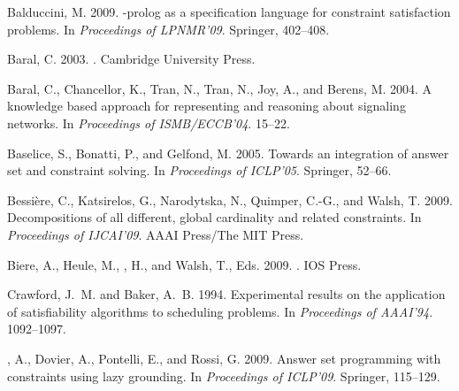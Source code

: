 \documentclass{tlp}
\begin{document}
\begin{thebibliography}{}

{\sc Balduccini, M.} 2009.
-prolog as a specification language for constraint satisfaction
  problems.
\newblock In {\em Proceedings of LPNMR'09}. Springer, 402--408.

{\sc Baral, C.} 2003.
.
\newblock Cambridge University Press.

{\sc Baral, C.}, {\sc Chancellor, K.}, {\sc Tran, N.}, {\sc Tran, N.}, {\sc
  Joy, A.}, {\sc and} {\sc Berens, M.} 2004.
\newblock A knowledge based approach for representing and reasoning about
  signaling networks.
\newblock In {\em Proceedings of ISMB/ECCB'04}. 15--22.

{\sc Baselice, S.}, {\sc Bonatti, P.}, {\sc and} {\sc Gelfond, M.} 2005.
\newblock Towards an integration of answer set and constraint solving.
\newblock In {\em Proceedings of ICLP'05}. Springer, 52--66.

{\sc Bessi{\`e}re, C.}, {\sc Katsirelos, G.}, {\sc Narodytska, N.}, {\sc
  Quimper, C.-G.}, {\sc and} {\sc Walsh, T.} 2009.
\newblock Decompositions of all different, global cardinality and related
  constraints.
\newblock In {\em Proceedings of IJCAI'09}. AAAI Press/The MIT Press.

{\sc Biere, A.}, {\sc Heule, M.}, {, H.}, {\sc and} {\sc Walsh,
  T.}, Eds. 2009.
.
\newblock IOS Press.

{\sc Crawford, J.~M.} {\sc and} {\sc Baker, A.~B.} 1994.
\newblock Experimental results on the application of satisfiability algorithms
  to scheduling problems.
\newblock In {\em Proceedings of AAAI'94}. 1092--1097.

{, A.}, {\sc Dovier, A.}, {\sc Pontelli, E.}, {\sc and} {\sc
  Rossi, G.} 2009.
\newblock Answer set programming with constraints using lazy grounding.
\newblock In {\em Proceedings of ICLP'09}. Springer, 115--129.


\end{thebibliography}
\end{document}
